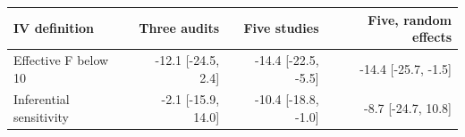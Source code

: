 \begin{tabular}{lrrr}
\toprule
IV definition & Three audits & Five studies & Five, random effects \\
\midrule
Effective F below 10 & -12.1 [-24.5, 2.4] & -14.4 [-22.5, -5.5] & -14.4 [-25.7, -1.5] \\
Inferential sensitivity & -2.1 [-15.9, 14.0] & -10.4 [-18.8, -1.0] & -8.7 [-24.7, 10.8] \\
\bottomrule
\end{tabular}
